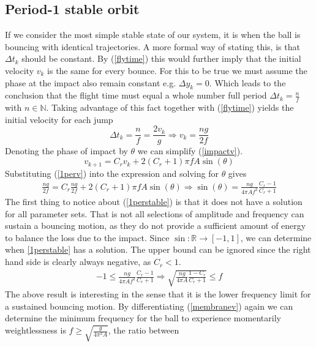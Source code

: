 \documentclass[12pt,oneside,a4paper]{article}
\numberwithin{equation}{section}
\begin{document}
{{{{\subsection{Period-1 stable orbit}
If we consider the most simple stable state of our system, it is when the ball is bouncing with identical trajectories. A more formal way of stating this, is that $\Delta t_k$ should be constant. By  (\ref{flytime}) this would further imply that the initial velocity $v_k$ is the same for every bounce. For this to be true we must assume the phase at the impact also remain constant e.g. $\Delta y_k=0$. Which leads to the conclusion that the flight time must equal a whole number full period $\Delta t_k = \frac{n}{f}$ with $n\in \mathbb{N}$. Taking advantage of this fact together with (\ref{flytime}) yields the initial velocity for each jump
\begin{equation}
	\Delta t_k = \frac{n}{f} = \frac{2v_k}{g} \Rightarrow v_k = \frac{ng}{2f}
	\label{1perv}
\end{equation}
Denoting the phase of impact by $\theta$ we can simplify (\ref{impactv}).
\begin{equation}
	v_{k+1} = C_rv_k+2(C_r+1)\pi fA \sin(\theta)
\end{equation}
Substituting (\ref{1perv}) into the expression and solving for $\theta$ gives
\begin{align}
	\frac{ng}{2f} = C_r\frac{ng}{2f}+2(C_r+1)\pi fA \sin(\theta) \Rightarrow \sin(\theta) = \frac{ng}{4\pi Af^2 }\frac{C_r-1}{C_r+1}
	\label{1perstable}
\end{align}
The first thing to notice about (\ref{1perstable}) is that it does not have a solution for all parameter sets. That is not all selections of amplitude and frequency can sustain a bouncing motion, as they do not provide a sufficient amount of energy to balance the loss due to the impact. Since $\sin: \mathbb{R} \rightarrow [-1,1]$, we can determine when \eqref{1perstable} has a solution. The upper bound can be  ignored since the right hand side is clearly always negative, as $C_r<1$.
\begin{align}
	-1 \le \frac{ng}{4\pi Af^2 }\frac{C_r-1}{C_r+1} \Rightarrow \sqrt{\frac{ng}{4\pi A}\frac{1-C_r}{C_r+1}} \le f
\end{align}
The above result is interesting in the sense that it is the lower frequency 
limit for a sustained bouncing motion. By differentiating (\ref{membranev}) 
again we can determine the minimum frequency for the ball to experience 
momentarily weightlessness is $f\ge\sqrt{\frac{g}{4\pi^2A}}$, the ratio between 
}}}}
\end{document}
